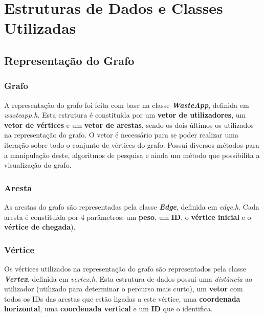 \documentclass[article, a4paper, 12pt, oneside]{memoir}
\begin{document}
\newpage
\chapter[Estruturas de Dados  e Classes Utilizadas][Estruturas de Dados e Classes Utilizadas]{Estruturas de Dados e Classes Utilizadas} \label{\thechapter}

\section{Representação do Grafo}

\subsection{Grafo}

A representação do grafo foi feita com base na classe \textbf{\textit{WasteApp}}, definida em \textit{wasteapp.h}.  Esta estrutura é constituída por um \textbf{vetor de utilizadores}, um \textbf{vetor de vértices} e um \textbf{vetor de arestas}, sendo os dois últimos os utilizados na representação do grafo. O vetor é necessário para se poder realizar uma iteração sobre todo o conjunto de vértices do grafo. Possui diversos métodos para a manipulação deste, algoritmos de pesquisa e ainda um método que possibilita a visualização do grafo.

\subsection{Aresta}

As arestas do grafo são representadas pela classe \textbf{\textit{Edge}}, definida em \textit{edge.h}. Cada aresta é constituída por 4 parâmetros: um \textbf{peso}, um \textbf{ID}, o \textbf{vértice inicial} e o \textbf{vértice de chegada}).

\subsection{Vértice}

Os vértices utilizados na representação do grafo são representados pela classe \textbf{\textit{Vertex}}, definida em \textit{vertex.h}. Esta estrutura de dados possui uma \textit{distância} ao utilizador (utilizado para determinar o percurso mais curto), um \textbf{vetor} com todos os IDs das arestas que estão ligadas a este vértice, uma \textbf{coordenada horizontal}, uma \textbf{coordenada vertical} e um \textbf{ID} que o identifica.
\end{document}
